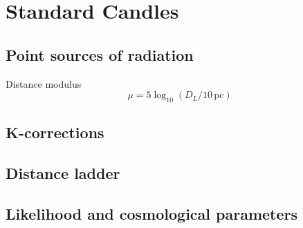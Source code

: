 \chapter{Standard Candles}


\section{Point sources of radiation}



Distance modulus
\begin{equation}
  \mu = 5 \log_{10}(D_L / 10\,\mbox{pc})
\end{equation}

\section{K-corrections}



\section{Distance ladder}



\section{Likelihood and cosmological parameters}
 
